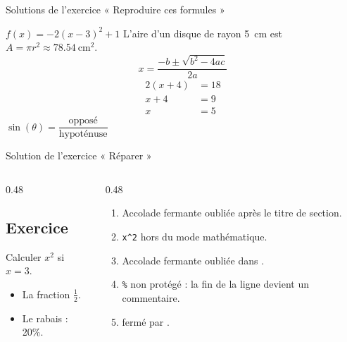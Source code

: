 \appendix

\begin{frame}[fragile]{Solutions de l'exercice « Reproduire ces formules »}
\begin{CodeTeX}[title={Une solution possible}]
$f(x) = -2(x - 3)^2 + 1$
L'aire d'un disque de rayon \qty{5}{\centi\metre} est
$A = \pi r^2 \approx \qty{78,54}{\centi\metre\squared}$.
\[ x = \frac{-b \pm \sqrt{b^2 - 4ac}}{2a} \]
\begin{align*}
  2(x + 4) &= 18 \\
  x + 4 &= 9 \\
  x &= 5
\end{align*}
$\sin(\theta) = \dfrac{\text{opposé}}{\text{hypoténuse}}$
\end{CodeTeX}
\end{frame}

\begin{frame}[fragile]{Solution de l'exercice « Réparer »}
  \begin{columns}[T]
    \begin{column}{0.48\textwidth}
\begin{CodeTeX}[title={Code corrigé}]
\section{Exercice}
Calculer $x^2$ si $x = 3$.
\begin{itemize}
  \item La fraction $\frac{1}{2}$.
  \item Le rabais : 20\%.
\end{itemize}
\end{CodeTeX}
    \end{column}
    \begin{column}{0.48\textwidth}
      \small
      \begin{enumerate}
        \item Accolade fermante oubliée après le titre de section.
        \item \texttt{x\^{}2} hors du mode mathématique.
        \item Accolade fermante oubliée dans .
        \item \texttt{\%} non protégé : la fin de la ligne devient un
          commentaire.
        \item {} fermé par
          .
      \end{enumerate}
    \end{column}
  \end{columns}
\end{frame}
